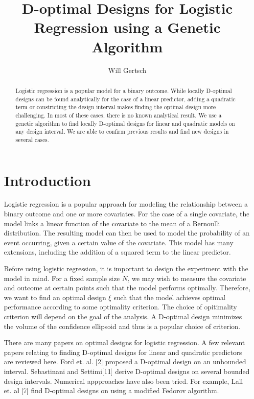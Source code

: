 \documentclass[11pt,a4paper]{article}
\title{D-optimal Designs for Logistic Regression using a Genetic Algorithm}
\author{Will Gertsch}
\begin{document}
\maketitle

\begin{abstract}
Logistic regression is a popular model for a binary outcome. While locally D-optimal designs can be found analytically for the case of a linear predictor, adding a quadratic term or constricting the design interval makes finding the optimal design more challenging. In most of these cases, there is no known analytical result. We use  a genetic algorithm to find locally D-optimal designs for linear and quadratic models on any design interval. We are able to confirm previous results and find new designs in several cases. 
\end{abstract}

\section{Introduction}
Logistic regression is a popular approach for modeling the relationship between a binary outcome and one or more covariates. For the case of a single covariate, the model links a linear function of the covariate to the mean of a Bernoulli distribution. The resulting model can then be used to model the probability of an event occurring, given a certain value of the covariate. This model has many extensions, including the addition of a squared term to the linear predictor.

Before using logistic regression, it is important to design the experiment with the model in mind. For a fixed sample size $N$, we may wish to measure the covariate and outcome at certain points such that the model performs optimally.  Therefore, we want to find an optimal design $\xi$ such that the model achieves optimal performance according to some optimality criterion. The choice of opitimality criterion will depend on the goal of the analysis. A D-optimal design minimizes the volume of the confidence ellipsoid and thus is a popular choice of criterion. 

There are many papers on optimal designs for logistic regression. A few relevant papers relating to finding D-optimal designs for linear and quadratic predictors are reviewed here.  Ford et. al. [2] proposed a D-optimal design on an unbounded interval. Sebastinani and Settimi[11] derive D-optimal designs on several bounded design intervals. Numerical appproaches have also been tried. For example, Lall et. al [7] find D-optimal designs on using a modified Fedorov algorithm.
\end{document}
